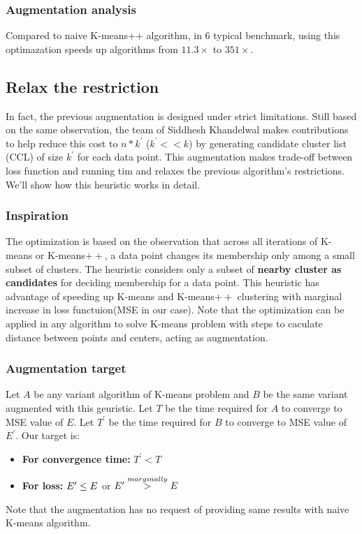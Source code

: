 \documentclass[11pt]{article}
\begin{document}
\subsubsection{Augmentation analysis}
Compared to naive K-means++ algorithm, in 6 typical benchmark, using this optimazation speeds up algorithms from $ 11.3 \times$ to $  351 \times$.

\subsection{Relax the restriction}
In fact, the previous augmentation is designed under strict limitations. Still based on the same observation, the team of Siddhesh Khandelwal\cite{Faster} makes contributions to help reduce this cost to $n * k^{\prime}$ ($k^{\prime} << k$) by generating candidate cluster list (CCL) of size $k^{\prime}$ for each data point. This augmentation makes trade-off between loss function and running tim and relaxes the previous algorithm's restrictions. We'll show how this heuristic works in detail.

\subsubsection{Inspiration}
The optimization is based on the observation that across all iterations of K-means or K-means$++$, a data point changes its membership only among a small subset of clusters. The heuristic considers only a subset of \textbf{nearby cluster as candidates} for deciding membership for a data point. This heuristic has advantage of speeding up K-means and K-means$++$ clustering with marginal increase in loss functuion(MSE in our case). Note that the optimization can be applied in any algorithm to solve K-means problem with steps to caculate distance between points and centers, acting as augmentation.
\subsubsection{Augmentation target}
Let $A$ be any variant algorithm of K-means problem and $B$ be the same variant augmented with this geuristic. Let $T$ be the time required for $A$ to converge to MSE value of $E$. Let $T^{\prime}$ be the time required for $B$ to converge to MSE value of $E^{\prime}$. Our target is:
\begin{itemize}
\item \textbf{For convergence time:} $T^{\prime} < T$
\item \textbf{For loss:} $E^{\prime} \le E \space $ or $ \space E^{\prime} \overset{marginally}{>} E$
\end{itemize}
Note that the augmentation has no request of providing same results with naive K-means algorithm.
\end{document}
